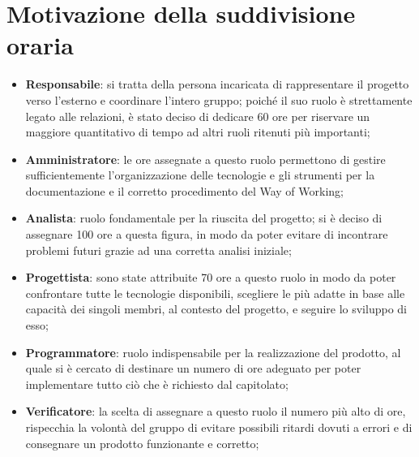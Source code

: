 \documentclass[a4paper,10pt]{article}
\begin{document}
\newpage

\section*{Motivazione della suddivisione oraria}
\begin{itemize}
    \item \textbf{Responsabile}: si tratta della persona incaricata di rappresentare il progetto verso l’esterno e coordinare l’intero gruppo; poiché il suo ruolo è strettamente legato alle relazioni, è stato deciso di dedicare 60 ore per riservare un maggiore quantitativo di tempo ad altri ruoli ritenuti più importanti;
    \item \textbf{Amministratore}: le ore assegnate a questo ruolo permettono di gestire sufficientemente l'organizzazione delle tecnologie e gli strumenti per la documentazione e il corretto procedimento del Way of Working;
    \item \textbf{Analista}: ruolo fondamentale per la riuscita del progetto; si è deciso di assegnare 100 ore a questa figura, in modo da poter evitare di incontrare problemi futuri grazie ad una corretta analisi iniziale;
    \item \textbf{Progettista}: sono state attribuite 70 ore a questo ruolo in modo da poter confrontare tutte le tecnologie disponibili, scegliere le più adatte in base alle capacità dei singoli membri, al contesto del progetto, e seguire lo sviluppo di esso;
    \item \textbf{Programmatore}: ruolo indispensabile per la realizzazione del prodotto, al quale si è cercato di destinare un numero di ore adeguato per poter implementare tutto ciò che è richiesto dal capitolato;
    \item \textbf{Verificatore}: la scelta di assegnare a questo ruolo il numero più alto di ore, rispecchia la volontà del gruppo di evitare possibili ritardi dovuti a errori e di consegnare un prodotto funzionante e corretto;
\end{itemize}
\end{document}
